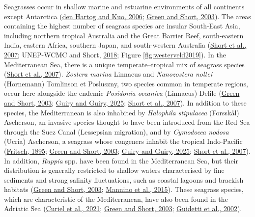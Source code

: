 \documentclass[
  12 pt,
]{book}
\begin{document}
Seagrasses occur in shallow marine and estuarine environments of all continents except Antarctica (\protect\hyperlink{ref-denHartog2006}{den Hartog and Kuo, 2006}; \protect\hyperlink{ref-Green2003}{Green and Short, 2003}). The areas containing the highest number of seagrass species are insular South-East Asia, including northern tropical Australia and the Great Barrier Reef, south-eastern India, eastern Africa, southern Japan, and south-western Australia (\protect\hyperlink{ref-Short2007}{Short et al., 2007}; UNEP-WCMC and Short, \protect\hyperlink{ref-UnitedNationsEnvironmentProgrammeWorldConservationMonitoringCentreUNEP-WCMC2018}{2018}; Figure \ref{fig:westerveld2019}). In the Mediterranean Sea, there is a unique temperate--tropical mix of seagrass species (\protect\hyperlink{ref-Short2007}{Short et al., 2007}). \emph{Zostera marina} Linnaeus and \emph{Nanozostera noltei} (Hornemann) Tomlinson et Posluszny, two species common in temperate regions, occur here alongside the endemic \emph{Posidonia oceanica} (Linnaeus) Delile (\protect\hyperlink{ref-Green2003}{Green and Short, 2003}; \protect\hyperlink{ref-Guiry2025}{Guiry and Guiry, 2025}; \protect\hyperlink{ref-Short2007}{Short et al., 2007}). In addition to these species, the Mediterranean is also inhabited by \emph{Halophila stipulacea} (Forsskål) Ascherson, an invasive species thought to have been introduced from the Red Sea through the Suez Canal (Lessepsian migration), and by \emph{Cymodocea nodosa} (Ucria) Ascherson, a seagrass whose congeners inhabit the tropical Indo-Pacific (\protect\hyperlink{ref-Fritsch1895}{Fritsch, 1895}; \protect\hyperlink{ref-Green2003}{Green and Short, 2003}; \protect\hyperlink{ref-Guiry2025}{Guiry and Guiry, 2025}; \protect\hyperlink{ref-Short2007}{Short et al., 2007}). In addition, \emph{Ruppia} spp. have been found in the Mediterranean Sea, but their distribution is generally restricted to shallow waters characterised by fine sediments and strong salinity fluctuations, such as coastal lagoons and brackish habitats (\protect\hyperlink{ref-Green2003}{Green and Short, 2003}; \protect\hyperlink{ref-Mannino2015}{Mannino et al., 2015}). These seagrass species, which are characteristic of the Mediterranean, have also been found in the Adriatic Sea (\protect\hyperlink{ref-Curiel2021}{Curiel et al., 2021}; \protect\hyperlink{ref-Green2003}{Green and Short, 2003}; \protect\hyperlink{ref-Guidetti2002}{Guidetti et al., 2002}).
\end{document}
